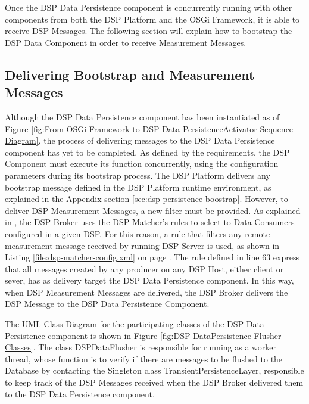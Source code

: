 Once the DSP Data Persistence component is concurrently running with other
components from both the DSP Platform and the OSGi Framework, it is able to
receive DSP Messages. The following section will explain how to bootstrap the
DSP Data Component in order to receive Measurement Messages.

\subsection{Delivering Bootstrap and Measurement Messages}

Although the DSP Data Persistence component has been instantiated as of Figure
\ref{fig:From-OSGi-Framework-to-DSP-Data-PersistenceActivator-Sequence-Diagram}, 
the process of delivering messages to the DSP Data Persistence component has yet
to be completed. As defined by the requirements, the DSP Component must execute its
function concurrently, using the configuration parameters during its
bootstrap process. The DSP Platform delivers any bootstrap message defined in
the DSP Platform runtime environment, as explained in the Appendix section
\ref{sec:dsp-persistence-boostrap}. However, to deliver DSP Measurement
Messages, a new filter must be provided. As explained in
\cite{netbeams-dsp-architecture}, the DSP Broker uses the DSP Matcher's rules
to select to Data Consumers configured in a given DSP. For this reason, a rule
that filters any remote measurement message received by running DSP Server is
used, as shown in Listing \ref{file:dsp-matcher-config.xml} on page
\pageref{file:dsp-matcher-config.xml}. The rule defined in line 63 express
that all messages created by any producer on any DSP Host, either client or
sever, has as delivery target the DSP Data Persistence component. In this way,
when DSP Measurement Messages are delivered, the DSP Broker delivers the DSP
Message to the DSP Data Persistence Component.

The UML Class Diagram for the participating classes of the DSP Data
Persistence component is shown in Figure
\ref{fig:DSP-DataPersistence-Flusher-Classes}. The class DSPDataFlusher is
responsible for running as a worker thread, whose function is to verify if
there are messages to be flushed to the Database by contacting the Singleton
class \cite{gof} TransientPersistenceLayer, responsible to keep track of the
DSP Messages received when the DSP Broker delivered them to the DSP Data
Persistence component.

